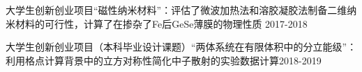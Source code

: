 \documentclass[12pt]{article}
\begin{document}
    \vspace{2mm}
    \begin{figure}[H]
    \begin{varwidth}[t]{0.5\textwidth}
    	\vspace{0pt}
    \end{varwidth}

    \end{figure}

    \vspace{5mm}
    \begin{varwidth}[t]{0.8\textwidth}
    \end{varwidth}
    \vspace{5mm}
    
    
    \vspace{5mm}
    \begin{varwidth}[t]{0.8\textwidth}
     
     
     
     
	\end{varwidth}
        
    \vspace{5mm}
    \vspace{2mm}
    \begin{myCvItems}
            \item 大学生创新创业项目“磁性纳米材料”：评估了微波加热法和溶胶凝胶法制备二维纳米材料的可行性，计算了在掺杂了Fe后GeSe薄膜的物理性质 \hfill 2017-2018
            \item 大学生创新创业项目（本科毕业设计课题）“两体系统在有限体积中的分立能级”：利用格点计算背景中的立方对称性简化中子散射的实验数据计算\hfill2018-2019 
    \end{myCvItems}
\end{document}

